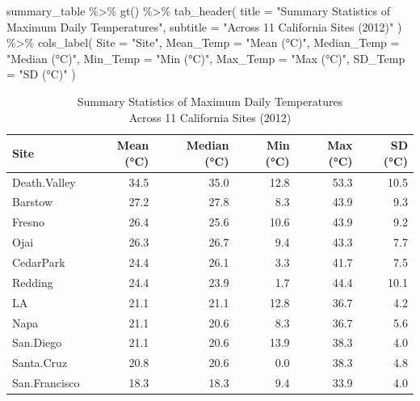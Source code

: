 \documentclass[
  11pt,
]{article}
\newenvironment{Shaded}{\begin{snugshade}}{\end{snugshade}}
\newcommand{\AttributeTok}[1]{\textcolor[rgb]{0.40,0.45,0.13}{#1}}
\newcommand{\FunctionTok}[1]{\textcolor[rgb]{0.28,0.35,0.67}{#1}}
\newcommand{\NormalTok}[1]{\textcolor[rgb]{0.00,0.23,0.31}{#1}}
\newcommand{\SpecialCharTok}[1]{\textcolor[rgb]{0.37,0.37,0.37}{#1}}
\newcommand{\StringTok}[1]{\textcolor[rgb]{0.13,0.47,0.30}{#1}}
\begin{document}
\begin{Shaded}
\begin{Highlighting}[]
\NormalTok{summary\_table }\SpecialCharTok{\%\textgreater{}\%}
  \FunctionTok{gt}\NormalTok{() }\SpecialCharTok{\%\textgreater{}\%}
  \FunctionTok{tab\_header}\NormalTok{(}
    \AttributeTok{title =} \StringTok{"Summary Statistics of Maximum Daily Temperatures"}\NormalTok{,}
    \AttributeTok{subtitle =} \StringTok{"Across 11 California Sites (2012)"}
\NormalTok{  ) }\SpecialCharTok{\%\textgreater{}\%}
  \FunctionTok{cols\_label}\NormalTok{(}
    \AttributeTok{Site =} \StringTok{"Site"}\NormalTok{,}
    \AttributeTok{Mean\_Temp =} \StringTok{"Mean (°C)"}\NormalTok{,}
    \AttributeTok{Median\_Temp =} \StringTok{"Median (°C)"}\NormalTok{,}
    \AttributeTok{Min\_Temp =} \StringTok{"Min (°C)"}\NormalTok{,}
    \AttributeTok{Max\_Temp =} \StringTok{"Max (°C)"}\NormalTok{,}
    \AttributeTok{SD\_Temp =} \StringTok{"SD (°C)"}
\NormalTok{  )}
\end{Highlighting}
\end{Shaded}

\begin{table}
\caption*{
{\large Summary Statistics of Maximum Daily Temperatures} \\ 
{\small Across 11 California Sites (2012)}
} 
\fontsize{12.0pt}{14.4pt}\selectfont
\begin{tabular*}{\linewidth}{@{\extracolsep{\fill}}lrrrrr}
\toprule
Site & Mean (°C) & Median (°C) & Min (°C) & Max (°C) & SD (°C) \\ 
\midrule\addlinespace[2.5pt]
Death.Valley & 34.5 & 35.0 & 12.8 & 53.3 & 10.5 \\ 
Barstow & 27.2 & 27.8 & 8.3 & 43.9 & 9.3 \\ 
Fresno & 26.4 & 25.6 & 10.6 & 43.9 & 9.2 \\ 
Ojai & 26.3 & 26.7 & 9.4 & 43.3 & 7.7 \\ 
CedarPark & 24.4 & 26.1 & 3.3 & 41.7 & 7.5 \\ 
Redding & 24.4 & 23.9 & 1.7 & 44.4 & 10.1 \\ 
LA & 21.1 & 21.1 & 12.8 & 36.7 & 4.2 \\ 
Napa & 21.1 & 20.6 & 8.3 & 36.7 & 5.6 \\ 
San.Diego & 21.1 & 20.6 & 13.9 & 38.3 & 4.0 \\ 
Santa.Cruz & 20.8 & 20.6 & 0.0 & 38.3 & 4.8 \\ 
San.Francisco & 18.3 & 18.3 & 9.4 & 33.9 & 4.0 \\ 
\bottomrule
\end{tabular*}
\end{table}
\end{document}
